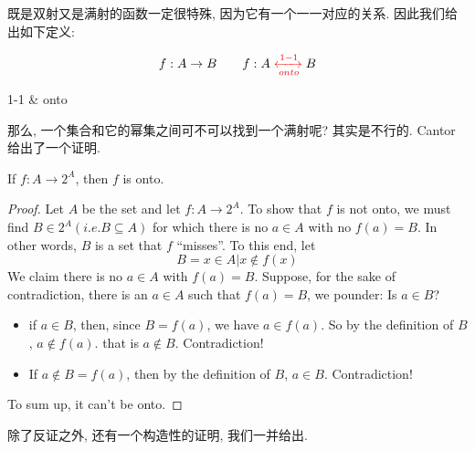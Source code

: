 既是双射又是满射的函数一定很特殊, 因为它有一个一一对应的关系. 因此我们给出如下定义: 

\begin{definition}
    \[
      f: A \to B \qquad {f: A \textcolor{red}{\;\xleftrightarrow[onto]{1-1}\;} B}
    \]
    \begin{center}
      {1-1 \& onto}
    \end{center}
\end{definition}

那么, 一个集合和它的幂集之间可不可以找到一个满射呢? 其实是不行的. Cantor给出了一个证明.

\begin{theorem}
    If $f: A \to 2^{A}$, then $f$ is  onto.
\end{theorem}

\begin{proof}
    Let $A$ be the set and let $f:A\rightarrow 2^A$. To show that $f$ is not onto, we must find $B\in 2^A(i.e. B\subseteq A )$ for which there is no $a\in A$ with no $f(a)=B$. In other words, $B$ is a set that $f$ ``misses''. To this end, let 
    $$
    B={x\in A | x \notin f(x)}
    $$
    We claim there is no $a\in A $ with $f(a)=B$. 
    Suppose, for the sake of contradiction, there is an $a\in A$ such that $f(a)=B$, we pounder: Is $a\in B$?
    \begin{itemize}
        \item if $a\in B$, then, since $B=f(a)$, we have $a\in f(a)$. So by the definition of $B$ , $a\notin f(a)$. that is $a\notin B$. Contradiction!
        \item If $a\notin B=f(a)$, then by the definition of $B$, $a\in B$. Contradiction!  
    \end{itemize} 
    To sum up, it can't be onto. 
\end{proof}

除了反证之外, 还有一个构造性的证明, 我们一并给出. 

